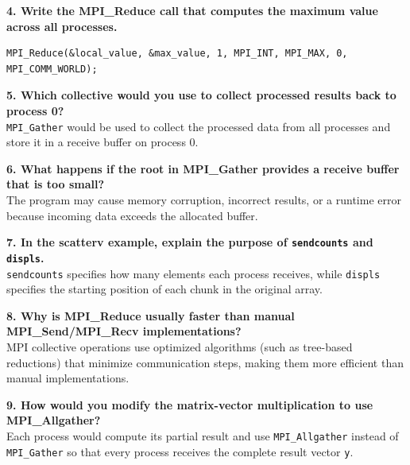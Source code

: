 \documentclass[12pt]{article}
\begin{document}
\vspace{0.3cm}

\textbf{4. Write the MPI\_Reduce call that computes the maximum value across all processes.} \\
\begin{lstlisting}
MPI_Reduce(&local_value, &max_value, 1, MPI_INT, MPI_MAX, 0, MPI_COMM_WORLD);
\end{lstlisting}

\vspace{0.3cm}

\textbf{5. Which collective would you use to collect processed results back to process 0?} \\
\texttt{MPI\_Gather} would be used to collect the processed data from all processes and store it in a receive buffer on process 0.

\vspace{0.3cm}

\textbf{6. What happens if the root in MPI\_Gather provides a receive buffer that is too small?} \\
The program may cause memory corruption, incorrect results, or a runtime error because incoming data exceeds the allocated buffer.

\vspace{0.3cm}

\textbf{7. In the scatterv example, explain the purpose of \texttt{sendcounts} and \texttt{displs}.} \\
\texttt{sendcounts} specifies how many elements each process receives, while \texttt{displs} specifies the starting position of each chunk in the original array.

\vspace{0.3cm}

\textbf{8. Why is MPI\_Reduce usually faster than manual MPI\_Send/MPI\_Recv implementations?} \\
MPI collective operations use optimized algorithms (such as tree-based reductions) that minimize communication steps, making them more efficient than manual implementations.

\vspace{0.3cm}

\textbf{9. How would you modify the matrix-vector multiplication to use MPI\_Allgather?} \\
Each process would compute its partial result and use \texttt{MPI\_Allgather} instead of \texttt{MPI\_Gather} so that every process receives the complete result vector \texttt{y}.
\end{document}
